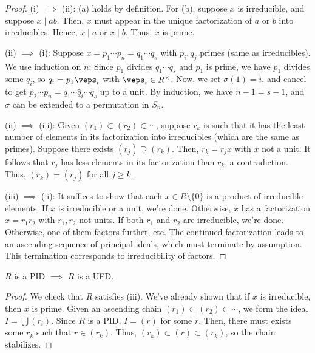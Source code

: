 \begin{proof}
    \hfill

    (i) $\implies$ (ii): (a) holds by definition. For (b), suppose $x$ is irreducible, and suppose $x \mid ab$. Then, $x$ must appear in the unique factorization of $a$ or $b$ into irreducibles. Hence, $x \mid a$ or $x \mid b$. Thus, $x$ is prime.

    (ii) $\implies$ (i): Suppose $x=p_1\cdots p_n=q_1\cdots q_s$ with $p_i,q_j$ primes (same as irreducibles). We use induction on $n$: Since $p_1$ divides $q_1\cdots q_s$ and $p_1$ is prime, we have $p_1$ divides some $q_i$, so $q_i = p_1\veps _i$ with $\veps_i \in R^\times$. Now, we set $\sigma(1)=i$, and cancel to get $p_2\cdots p_n=q_1\cdots \hat q_i\cdots q_s$ up to a unit. By induction, we have $n-1=s-1$, and $\sigma$ can be extended to a permutation in $S_n$.

    (ii) $\implies$ (iii): Given $(r_1)\subset (r_2)\subset \cdots$, suppose $r_k$ is such that it has the least number of elements in its factorization into irreducibles (which are the same as primes). Suppose there exists $(r_j) \supsetneq (r_k)$. Then, $r_k=r_jx$ with $x$ not a unit. It follows that $r_j$ has less elements in its factorization than $r_k$, a contradiction. Thus, $(r_k) = (r_j)$ for all $j \geq k$.

    (iii) $\implies$ (ii): It suffices to show that each $x \in R \setminus \{0\}$ is a product of irreducible elements. If $x$ is irreducible or a unit, we're done. Otherwise, $x$ has a factorization $x=r_1r_2$ with $r_1,r_2$ not units. If both $r_1$ and $r_2$ are irreducible, we're done. Otherwise, one of them factors further, etc. The continued factorization leads to an ascending sequence of principal ideals, which must terminate by assumption. This termination corresponds to irreducibility of factors.
\end{proof}

\begin{thm}
    $R$ is a PID $\implies$ $R$ is a UFD.
\end{thm}

\begin{proof}
    We check that $R$ satisfies (iii). We've already shown that if $x$ is irreducible, then $x$ is prime. Given an ascending chain $(r_1)\subset (r_2)\subset \cdots$, we form the ideal $I=\bigcup (r_i)$. Since $R$ is a PID, $I=(r)$ for some $r$. Then, there must exists some $r_k$ such that $r \in (r_k)$. Thus, $(r_k) \subset (r) \subset (r_k)$, so the chain stabilizes.
\end{proof}

